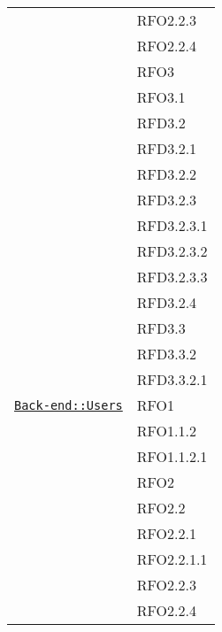 \begin{longtable}{|>{\centering}m{10cm}|m{3cm}<{\centering}|}
& RFO2.2.3\\
& RFO2.2.4\\
& RFO3\\
& RFO3.1\\
& RFD3.2\\
& RFD3.2.1\\
& RFD3.2.2\\
& RFD3.2.3\\
& RFD3.2.3.1\\
& RFD3.2.3.2\\
& RFD3.2.3.3\\
& RFD3.2.4\\
& RFD3.3\\
& RFD3.3.2\\
& RFD3.3.2.1\\ \hline

\hyperref[Back-end::Users]{\texttt{Back-end::Users}} & RFO1\\
& RFO1.1.2\\
& RFO1.1.2.1\\
& RFO2\\
& RFO2.2\\
& RFO2.2.1\\
& RFO2.2.1.1\\
& RFO2.2.3\\
& RFO2.2.4\\ \hline


\end{longtable}
